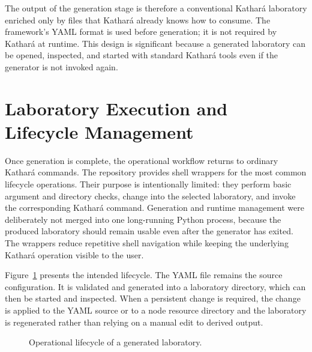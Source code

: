 The output of the generation stage is therefore a conventional Kathar\'a
laboratory enriched only by files that Kathar\'a already knows how to consume.
The framework's YAML format is used before generation; it is not required by
Kathar\'a at runtime. This design is significant because a generated laboratory
can be opened, inspected, and started with standard Kathar\'a tools even if the
generator is not invoked again.

\section{Laboratory Execution and Lifecycle Management}
\label{sec:laboratory-lifecycle}

Once generation is complete, the operational workflow returns to ordinary
Kathar\'a commands. The repository provides shell wrappers for the most common
lifecycle operations. Their purpose is intentionally limited: they perform
basic argument and directory checks, change into the selected laboratory, and
invoke the corresponding Kathar\'a command. Generation and runtime management
were deliberately not merged into one long-running Python process, because the
produced laboratory should remain usable even after the generator has exited.
The wrappers reduce repetitive shell navigation while keeping the underlying
Kathar\'a operation visible to the user.

Figure~\ref{fig:lifecycle-loop} presents the intended lifecycle. The YAML file
remains the source configuration. It is validated and generated into a
laboratory directory, which can then be started and inspected. When a persistent
change is required, the change is applied to the YAML source or to a node
resource directory and the laboratory is regenerated rather than relying on a
manual edit to derived output.

\begin{figure}[htbp]
\centering
{}
\caption{Operational lifecycle of a generated laboratory.}
\label{fig:lifecycle-loop}
\end{figure}

